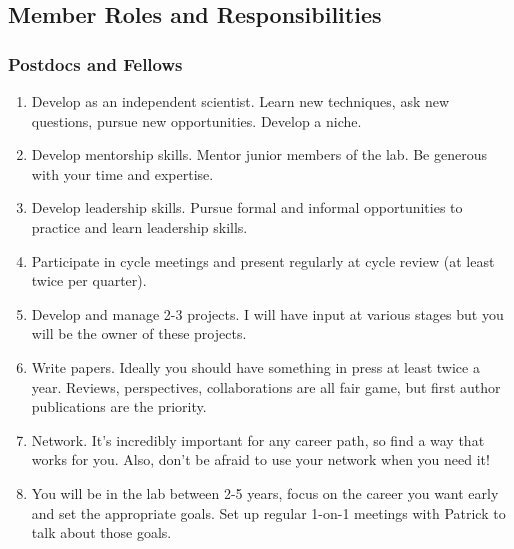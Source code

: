 \documentclass[10pt, letterpaper, twocolumn]{article} %
\begin{document}
\subsection{Member Roles and Responsibilities}

\subsubsection{Postdocs and Fellows}
\begin{enumerate}
\item Develop as an independent scientist. Learn new techniques, ask new questions, pursue new opportunities. Develop a niche.
\item Develop mentorship skills. Mentor junior members of the lab. Be generous with your time and expertise.
\item Develop leadership skills. Pursue formal and informal opportunities to practice and learn leadership skills.
\item Participate in cycle meetings and present regularly at cycle review (at least twice per quarter).
\item Develop and manage 2-3 projects. I will have input at various stages but you will be the owner of these projects.
\item Write papers. Ideally you should have something in press at least twice a year. Reviews, perspectives, collaborations are all fair game, but first author publications are the priority.
\item Network. It's incredibly important for any career path, so find a way that works for you. Also, don't be afraid to use your network when you need it!
\item You will be in the lab between 2-5 years, focus on the career you want early and set the appropriate goals. Set up regular 1-on-1 meetings with Patrick to talk about those goals.
\end{enumerate}
\end{document}
